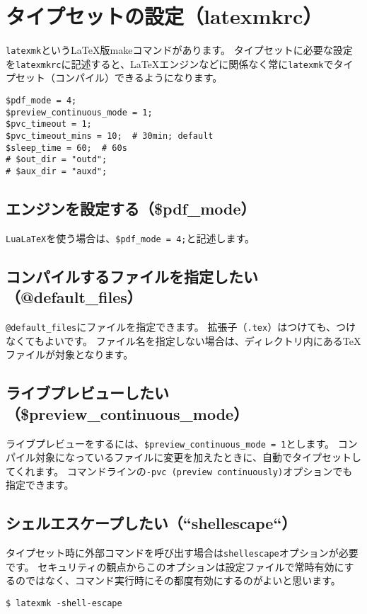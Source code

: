 \section{タイプセットの設定（latexmkrc）}

\texttt{latexmk}というLaTeX版makeコマンドがあります。
タイプセットに必要な設定を\texttt{latexmkrc}に記述すると、LaTeXエンジンなどに関係なく常に\texttt{latexmk}でタイプセット（コンパイル）できるようになります。

\begin{verbatim}
$pdf_mode = 4;
$preview_continuous_mode = 1;
$pvc_timeout = 1;
$pvc_timeout_mins = 10;  # 30min; default
$sleep_time = 60;  # 60s
# $out_dir = "outd";
# $aux_dir = "auxd";
\end{verbatim}

\subsection{エンジンを設定する（\$pdf\_mode）}

\texttt{LuaLaTeX}を使う場合は、\texttt{\$pdf\_mode = 4;}と記述します。

\subsection{コンパイルするファイルを指定したい（@default\_files）}

\texttt{@default\_files}にファイルを指定できます。
拡張子（\texttt{.tex}）はつけても、つけなくてもよいです。
ファイル名を指定しない場合は、ディレクトリ内にあるTeXファイルが対象となります。

\subsection{ライブプレビューしたい（\$preview\_continuous\_mode）}

ライブプレビューをするには、\texttt{\$preview\_continuous\_mode = 1}とします。
コンパイル対象になっているファイルに変更を加えたときに、自動でタイプセットしてくれます。
コマンドラインの\texttt{-pvc (preview continuously)}オプションでも指定できます。

\subsection{シェルエスケープしたい（``\-shell\-escape``）}

タイプセット時に外部コマンドを呼び出す場合は\texttt{\-shell\-escape}オプションが必要です。
セキュリティの観点からこのオプションは設定ファイルで常時有効にするのではなく、コマンド実行時にその都度有効にするのがよいと思います。

\begin{verbatim}
$ latexmk -shell-escape
\end{verbatim}
